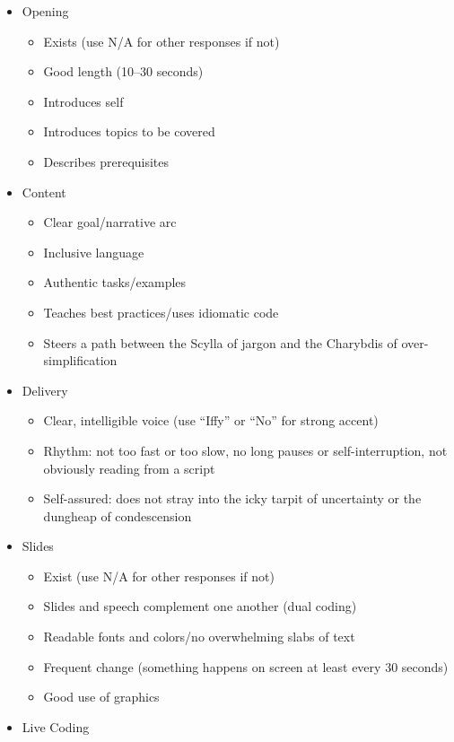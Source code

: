 \begin{itemize}
\item
  Opening

  \begin{itemize}
  \item
    Exists (use N/A for other responses if not)
  \item
    Good length (10--30 seconds)
  \item
    Introduces self
  \item
    Introduces topics to be covered
  \item
    Describes prerequisites
  \end{itemize}
\item
  Content

  \begin{itemize}
  \item
    Clear goal/narrative arc
  \item
    Inclusive language
  \item
    Authentic tasks/examples
  \item
    Teaches best practices/uses idiomatic code
  \item
    Steers a path between the Scylla of jargon and the Charybdis of over-simplification
  \end{itemize}
\item
  Delivery

  \begin{itemize}
  \item
    Clear, intelligible voice (use ``Iffy'' or ``No'' for strong accent)
  \item
    Rhythm: not too fast or too slow, no long pauses or self-interruption, not obviously reading from a script
  \item
    Self-assured: does not stray into the icky tarpit of uncertainty or the dungheap of condescension
  \end{itemize}
\item
  Slides

  \begin{itemize}
  \item
    Exist (use N/A for other responses if not)
  \item
    Slides and speech complement one another (dual coding)
  \item
    Readable fonts and colors/no overwhelming slabs of text
  \item
    Frequent change (something happens on screen at least every 30 seconds)
  \item
    Good use of graphics
  \end{itemize}
\item
  Live Coding


\end{itemize}
